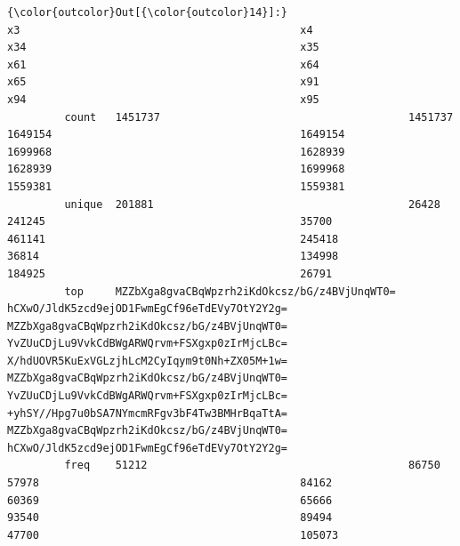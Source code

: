 \documentclass[11pt]{article}
\begin{document}
\begin{Verbatim}[commandchars=\\\{\}]
{\color{outcolor}Out[{\color{outcolor}14}]:}                                                   x3                                            x4                                           x34                                           x35                                           x61                                           x64                                           x65                                           x91                                           x94                                           x95
         count   1451737                                       1451737                                       1649154                                       1649154                                       1699968                                       1628939                                       1628939                                       1699968                                       1559381                                       1559381                                     
         unique  201881                                        26428                                         241245                                        35700                                         461141                                        245418                                        36814                                         134998                                        184925                                        26791                                       
         top     MZZbXga8gvaCBqWpzrh2iKdOkcsz/bG/z4BVjUnqWT0=  hCXwO/JldK5zcd9ejOD1FwmEgCf96eTdEVy7OtY2Y2g=  MZZbXga8gvaCBqWpzrh2iKdOkcsz/bG/z4BVjUnqWT0=  YvZUuCDjLu9VvkCdBWgARWQrvm+FSXgxp0zIrMjcLBc=  X/hdUOVR5KuExVGLzjhLcM2CyIqym9t0Nh+ZX05M+1w=  MZZbXga8gvaCBqWpzrh2iKdOkcsz/bG/z4BVjUnqWT0=  YvZUuCDjLu9VvkCdBWgARWQrvm+FSXgxp0zIrMjcLBc=  +yhSY//Hpg7u0bSA7NYmcmRFgv3bF4Tw3BMHrBqaTtA=  MZZbXga8gvaCBqWpzrh2iKdOkcsz/bG/z4BVjUnqWT0=  hCXwO/JldK5zcd9ejOD1FwmEgCf96eTdEVy7OtY2Y2g=
         freq    51212                                         86750                                         57978                                         84162                                         60369                                         65666                                         93540                                         89494                                         47700                                         105073                                      
\end{Verbatim}
            
\end{document}
